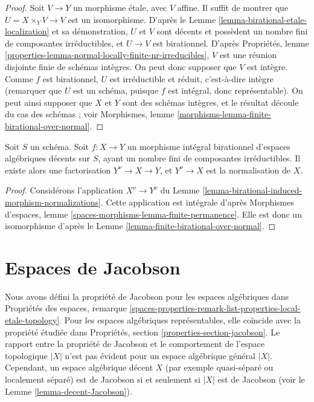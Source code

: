 \begin{proof}
Soit $V \to Y$ un morphisme étale, avec $V$ affine. Il suffit de montrer que
$U = X \times_Y V \to V$ est un isomorphisme. D'après le
Lemme \ref{lemma-birational-etale-localization} et sa démonstration,
$U$ et $V$ sont décents et possèdent un nombre fini de composantes
irréductibles, et $U \to V$ est birationnel. D'après Propriétés, lemme
\ref{properties-lemma-normal-locally-finite-nr-irreducibles},
$V$ est une réunion disjointe finie de schémas intègres.
On peut donc supposer que $V$ est intègre. Comme $f$ est birationnel, $U$ est
irréductible et réduit, c'est-à-dire intègre
(remarquer que $U$ est un schéma, puisque $f$ est intégral, donc
représentable). On peut ainsi supposer que $X$ et $Y$ sont des schémas
intègres, et le résultat découle du cas des schémas ; voir Morphismes, lemme
\ref{morphisms-lemma-finite-birational-over-normal}.
\end{proof}

\begin{lemma}
\label{lemma-normalization-normal}
Soit $S$ un schéma. Soit $f : X \to Y$ un morphisme intégral birationnel
d'espaces algébriques décents sur $S$, ayant un nombre fini de composantes
irréductibles. Il existe alors une factorisation $Y^\nu \to X \to Y$, et
$Y^\nu \to X$ est la normalisation de $X$.
\end{lemma}

\begin{proof}
Considérons l'application $X^\nu \to Y^\nu$ du
Lemme \ref{lemma-birational-induced-morphism-normalizations}.
Cette application est intégrale d'après Morphismes d'espaces, lemme
\ref{spaces-morphisms-lemma-finite-permanence}.
Elle est donc un isomorphisme d'après le
Lemme \ref{lemma-finite-birational-over-normal}.
\end{proof}




\section{Espaces de Jacobson}
\label{section-jacobson}

\noindent
Nous avons défini la propriété de Jacobson pour les espaces algébriques dans
Propriétés des espaces, remarque
\ref{spaces-properties-remark-list-properties-local-etale-topology}.
Pour les espaces algébriques représentables, elle coïncide avec la propriété
étudiée dans Propriétés, section \ref{properties-section-jacobson}.
Le rapport entre la propriété de Jacobson et le comportement de l'espace
topologique $|X|$ n'est pas évident pour un espace algébrique général $|X|$.
Cependant, un espace algébrique décent $X$ (par exemple quasi-séparé ou
localement séparé) est de Jacobson si et seulement si $|X|$ est de Jacobson
(voir le Lemme \ref{lemma-decent-Jacobson}).

